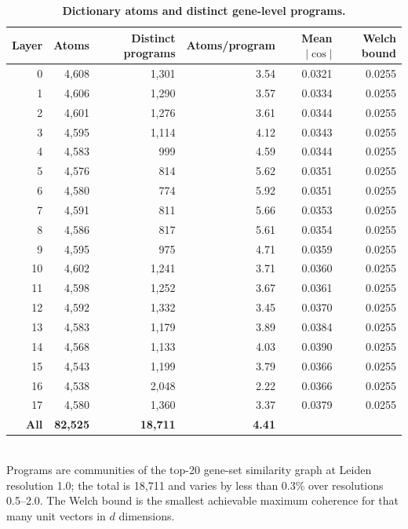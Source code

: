 \documentclass[11pt]{article}
\begin{document}
\begin{table}[htbp]
\centering
\caption{\textbf{Dictionary atoms and distinct gene-level programs.}}
\label{tab:concepts}
\smallskip
\small
\begin{tabular}{rrrrrr}
\toprule
Layer & Atoms & Distinct programs & Atoms/program & Mean $|\cos|$ & Welch bound \\
\midrule
0 & 4,608 & 1,301 & 3.54 & 0.0321 & 0.0255 \\
1 & 4,606 & 1,290 & 3.57 & 0.0334 & 0.0255 \\
2 & 4,601 & 1,276 & 3.61 & 0.0344 & 0.0255 \\
3 & 4,595 & 1,114 & 4.12 & 0.0343 & 0.0255 \\
4 & 4,583 & 999 & 4.59 & 0.0344 & 0.0255 \\
5 & 4,576 & 814 & 5.62 & 0.0351 & 0.0255 \\
6 & 4,580 & 774 & 5.92 & 0.0351 & 0.0255 \\
7 & 4,591 & 811 & 5.66 & 0.0353 & 0.0255 \\
8 & 4,586 & 817 & 5.61 & 0.0354 & 0.0255 \\
9 & 4,595 & 975 & 4.71 & 0.0359 & 0.0255 \\
10 & 4,602 & 1,241 & 3.71 & 0.0360 & 0.0255 \\
11 & 4,598 & 1,252 & 3.67 & 0.0361 & 0.0255 \\
12 & 4,592 & 1,332 & 3.45 & 0.0370 & 0.0255 \\
13 & 4,583 & 1,179 & 3.89 & 0.0384 & 0.0255 \\
14 & 4,568 & 1,133 & 4.03 & 0.0390 & 0.0255 \\
15 & 4,543 & 1,199 & 3.79 & 0.0366 & 0.0255 \\
16 & 4,538 & 2,048 & 2.22 & 0.0366 & 0.0255 \\
17 & 4,580 & 1,360 & 3.37 & 0.0379 & 0.0255 \\
\midrule
\textbf{All} & \textbf{82,525} & \textbf{18,711} & \textbf{4.41} &  &  \\
\bottomrule
\end{tabular}
\\[2pt]
\footnotesize Programs are communities of the top-20 gene-set similarity graph at Leiden resolution 1.0; the total is 18,711 and varies by less than 0.3\% over resolutions 0.5--2.0. The Welch bound is the smallest achievable maximum coherence for that many unit vectors in $d$ dimensions.
\end{table}
\end{document}

